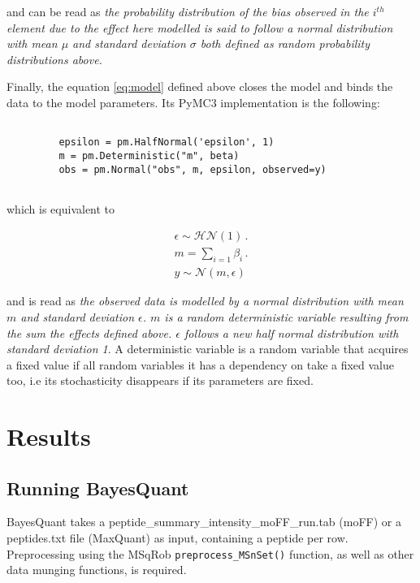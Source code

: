 and can be read as \textit{the probability distribution of the bias observed in the $i^{th}$ element due to the effect here modelled is said to follow a normal distribution with mean $\mu$ and standard deviation $\sigma$ both defined as random probability distributions above.}

Finally, the equation \ref{eq:model} defined above closes the model and binds the data to the model parameters. Its PyMC3 implementation is the following:

\begin{verbatim}
               
         epsilon = pm.HalfNormal('epsilon', 1)                
         m = pm.Deterministic("m", beta)
         obs = pm.Normal("obs", m, epsilon, observed=y)
      
\end{verbatim}

which is equivalent to

\begin{align}
\nonumber \epsilon \sim \mathcal{HN}(1) \,. \\ 
m = \sum_{i=1} \beta_i \,. \\ 
\nonumber y \sim \mathcal{N}(m, \epsilon)
\end{align}

and is read as \textit{the observed data is modelled by a normal distribution with mean $m$ and standard deviation $\epsilon$. $m$ is a random deterministic variable resulting from the sum the effects defined above. $\epsilon$ follows a new half normal distribution with standard deviation 1}. A deterministic variable is a random variable that acquires a fixed value if all random variables it has a dependency on take a fixed value too, i.e its stochasticity disappears if its parameters are fixed.




\section{Results}

\subsection{Running BayesQuant}

BayesQuant takes a peptide\_summary\_intensity\_moFF\_run.tab (moFF) or a peptides.txt file (MaxQuant) as input, containing a peptide per row. Preprocessing using the MSqRob \texttt{preprocess\_MSnSet()} function, as well as other data munging functions, is required.

